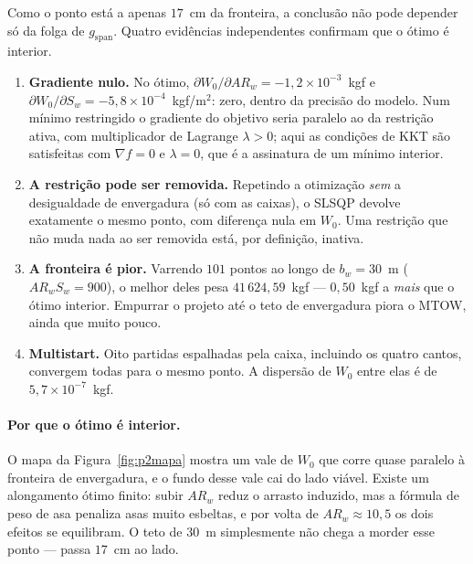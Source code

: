 Como o ponto está a apenas $17$~cm da fronteira, a conclusão não pode
depender só da folga de $g_{\mathrm{span}}$. Quatro evidências
independentes confirmam que o ótimo é interior.

\begin{enumerate}
\item \textbf{Gradiente nulo.} No ótimo,
      $\partial W_0/\partial AR_w = -1{,}2\times 10^{-3}$~kgf e
      $\partial W_0/\partial S_w = -5{,}8\times 10^{-4}$~kgf/m$^2$:
      zero, dentro da precisão do modelo. Num mínimo restringido o
      gradiente do objetivo seria paralelo ao da restrição ativa, com
      multiplicador de Lagrange $\lambda > 0$; aqui as condições de KKT
      são satisfeitas com $\nabla f = 0$ e $\lambda = 0$, que é a
      assinatura de um mínimo interior.

\item \textbf{A restrição pode ser removida.} Repetindo a otimização
      \emph{sem} a desigualdade de envergadura (só com as caixas),
      o SLSQP devolve exatamente o mesmo ponto, com diferença nula em
      $W_0$. Uma restrição que não muda nada ao ser removida está,
      por definição, inativa.

\item \textbf{A fronteira é pior.} Varrendo $101$ pontos ao longo de
      $b_w = 30$~m ($AR_w S_w = 900$), o melhor deles pesa
      $41\,624{,}59$~kgf --- $0{,}50$~kgf a \emph{mais} que o ótimo
      interior. Empurrar o projeto até o teto de envergadura piora o
      MTOW, ainda que muito pouco.

\item \textbf{Multistart.} Oito partidas espalhadas pela caixa,
      incluindo os quatro cantos, convergem todas para o mesmo ponto.
      A dispersão de $W_0$ entre elas é de $5{,}7\times 10^{-7}$~kgf.
\end{enumerate}

\paragraph{Por que o ótimo é interior.}
O mapa da Figura~\ref{fig:p2mapa} mostra um vale de $W_0$ que corre
quase paralelo à fronteira de envergadura, e o fundo desse vale cai
do lado viável. Existe um alongamento ótimo finito: subir $AR_w$ reduz o
arrasto induzido, mas a fórmula de peso de asa penaliza asas muito
esbeltas, e por volta de $AR_w \approx 10{,}5$ os dois efeitos se
equilibram. O teto de $30$~m simplesmente não chega a morder esse
ponto --- passa $17$~cm ao lado.

